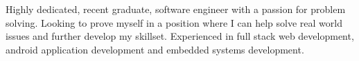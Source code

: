 

\begin{cvparagraph}

Highly dedicated, recent graduate, software engineer with a passion for problem solving. Looking to prove myself in a position where I can help solve real world issues and further develop my skillset. Experienced in full stack web development, android application development and embedded systems development.
\end{cvparagraph}
